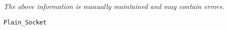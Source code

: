 \label{pkg:plain\_socket}

{\tiny \it The above information is manually maintained and may contain errors.}
\begin{verbatim}
Plain_Socket
\end{verbatim}

